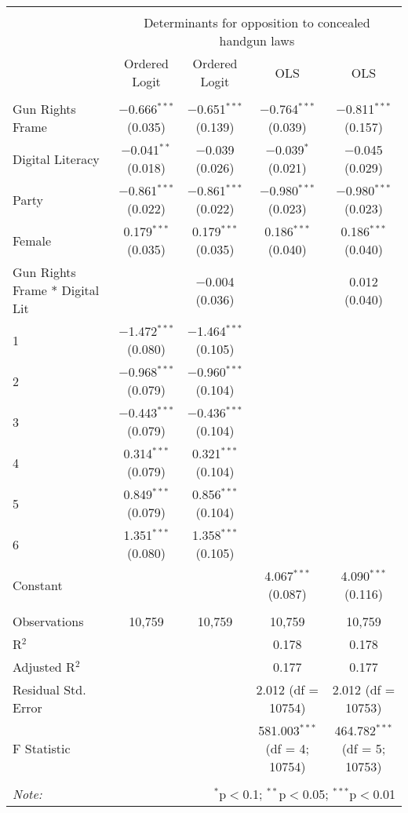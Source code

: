 
\begin{table}[!htbp] \centering 
  \caption{} 
  \label{} 
\begin{tabular}{@{\extracolsep{5pt}}lcccc} 
\\[-1.8ex]\hline 
\hline \\[-1.8ex] 
 & \multicolumn{4}{c}{Determinants for opposition to concealed handgun laws} \\ 
\cline{2-5} 
 & Ordered Logit & Ordered Logit & OLS & OLS \\ 
\hline \\[-1.8ex] 
 Gun Rights Frame & $-$0.666$^{***}$ (0.035) & $-$0.651$^{***}$ (0.139) & $-$0.764$^{***}$ (0.039) & $-$0.811$^{***}$ (0.157) \\ 
  Digital Literacy & $-$0.041$^{**}$ (0.018) & $-$0.039 (0.026) & $-$0.039$^{*}$ (0.021) & $-$0.045 (0.029) \\ 
  Party & $-$0.861$^{***}$ (0.022) & $-$0.861$^{***}$ (0.022) & $-$0.980$^{***}$ (0.023) & $-$0.980$^{***}$ (0.023) \\ 
  Female & 0.179$^{***}$ (0.035) & 0.179$^{***}$ (0.035) & 0.186$^{***}$ (0.040) & 0.186$^{***}$ (0.040) \\ 
  Gun Rights Frame * Digital Lit &  & $-$0.004 (0.036) &  & 0.012 (0.040) \\ 
  1\textbar 2 & $-$1.472$^{***}$ (0.080) & $-$1.464$^{***}$ (0.105) &  &  \\ 
  2\textbar 3 & $-$0.968$^{***}$ (0.079) & $-$0.960$^{***}$ (0.104) &  &  \\ 
  3\textbar 4 & $-$0.443$^{***}$ (0.079) & $-$0.436$^{***}$ (0.104) &  &  \\ 
  4\textbar 5 & 0.314$^{***}$ (0.079) & 0.321$^{***}$ (0.104) &  &  \\ 
  5\textbar 6 & 0.849$^{***}$ (0.079) & 0.856$^{***}$ (0.104) &  &  \\ 
  6\textbar 7 & 1.351$^{***}$ (0.080) & 1.358$^{***}$ (0.105) &  &  \\ 
  Constant &  &  & 4.067$^{***}$ (0.087) & 4.090$^{***}$ (0.116) \\ 
 \hline \\[-1.8ex] 
Observations & 10,759 & 10,759 & 10,759 & 10,759 \\ 
R$^{2}$ &  &  & 0.178 & 0.178 \\ 
Adjusted R$^{2}$ &  &  & 0.177 & 0.177 \\ 
Residual Std. Error &  &  & 2.012 (df = 10754) & 2.012 (df = 10753) \\ 
F Statistic &  &  & 581.003$^{***}$ (df = 4; 10754) & 464.782$^{***}$ (df = 5; 10753) \\ 
\hline 
\hline \\[-1.8ex] 
\textit{Note:}  & \multicolumn{4}{r}{$^{*}$p$<$0.1; $^{**}$p$<$0.05; $^{***}$p$<$0.01} \\ 
\end{tabular} 
\end{table} 
